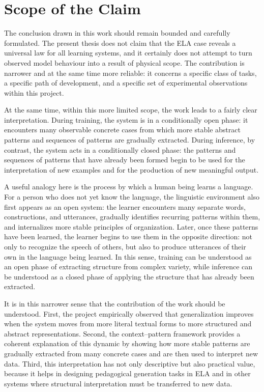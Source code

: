 \documentclass[12pt,a4paper,oneside]{report}
\begin{document}
\section{Scope of the Claim}

The conclusion drawn in this work should remain bounded and carefully formulated. The present thesis does not claim that the ELA case reveals a universal law for all learning systems, and it certainly does not attempt to turn observed model behaviour into a result of physical scope. The contribution is narrower and at the same time more reliable: it concerns a specific class of tasks, a specific path of development, and a specific set of experimental observations within this project.

At the same time, within this more limited scope, the work leads to a fairly clear interpretation. During training, the system is in a conditionally open phase: it encounters many observable concrete cases from which more stable abstract patterns and sequences of patterns are gradually extracted. During inference, by contrast, the system acts in a conditionally closed phase: the patterns and sequences of patterns that have already been formed begin to be used for the interpretation of new examples and for the production of new meaningful output.

A useful analogy here is the process by which a human being learns a language. For a person who does not yet know the language, the linguistic environment also first appears as an open system: the learner encounters many separate words, constructions, and utterances, gradually identifies recurring patterns within them, and internalizes more stable principles of organization. Later, once these patterns have been learned, the learner begins to use them in the opposite direction: not only to recognize the speech of others, but also to produce utterances of their own in the language being learned. In this sense, training can be understood as an open phase of extracting structure from complex variety, while inference can be understood as a closed phase of applying the structure that has already been extracted.

It is in this narrower sense that the contribution of the work should be understood. First, the project empirically observed that generalization improves when the system moves from more literal textual forms to more structured and abstract representations. Second, the context--pattern framework provides a coherent explanation of this dynamic by showing how more stable patterns are gradually extracted from many concrete cases and are then used to interpret new data. Third, this interpretation has not only descriptive but also practical value, because it helps in designing pedagogical generation tasks in ELA and in other systems where structural interpretation must be transferred to new data.
\end{document}
